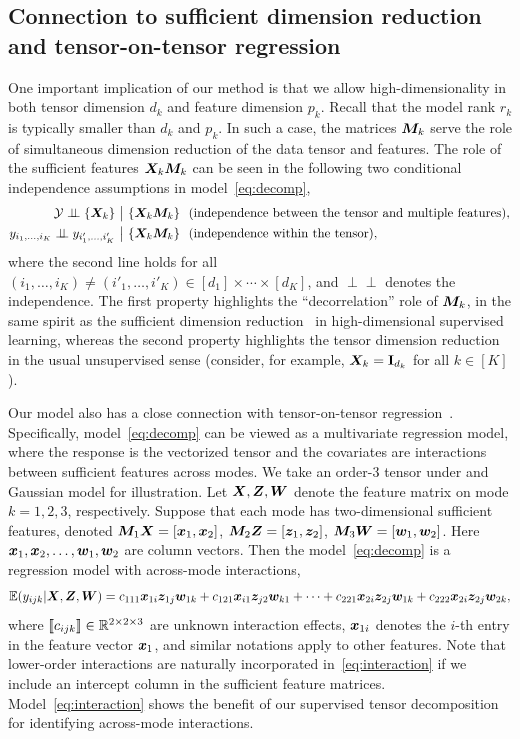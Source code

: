 \documentclass[12pt]{article}
\theoremstyle{definition}
\theoremstyle{definition}
\def\ci{\perp\!\!\!\perp}
\begin{document}
\subsection{Connection to sufficient dimension reduction and tensor-on-tensor regression}\label{sec:connection}
One important implication of our method is that we allow high-dimensionality in both tensor dimension $d_k$ and feature dimension $p_k$. Recall that the model rank $r_k$ is typically smaller than $d_k$ and $p_k$. In such a case, the matrices $\bm M_k$ serve the role of simultaneous dimension reduction of the data tensor and features. The role of the sufficient features $\bm X_k\bm M_k$ can be seen in the following two conditional independence assumptions in model~\eqref{eq:decomp},
\begin{align}
\tY \ci \{\mX_k\}&\ \big|\ \{\mX_k\mM_k\} \ \ \text{(independence between the tensor and multiple features)},\\
y_{i_1,\ldots,i_K} \ci y_{i'_1,\ldots,i'_K} & \ \big|\ \{\mX_k\mM_k\}  \ \ \text{(independence within the tensor)},
\end{align}
where the second line holds for all $(i_1,\ldots,i_K)\neq(i'_1,\ldots,i'_K) \in[d_1]\times\cdots\times[d_K]$, and $\ci$ denotes the independence. The first property highlights the ``decorrelation'' role of $\bm M_k$, in the same spirit as the sufficient dimension reduction~\citep{adragni2009sufficient} in high-dimensional supervised learning, whereas the second property highlights the tensor dimension reduction in the usual unsupervised sense (consider, for example, $\bm X_k=\mathbf{I}_{d_k}$ for all $k\in[K]$).

Our model also has a close connection with tensor-on-tensor regression~\citep{raskutti2019convex, lock2018tensor,han2020optimal}. Specifically, model~\eqref{eq:decomp} can be viewed as a multivariate regression model, where the response is the vectorized tensor and the covariates are interactions between sufficient features across modes. We take an order-3 tensor under and Gaussian model for illustration. Let $\bm X,\bm Z,\bm{W}$ denote the feature matrix on mode $k=1, 2, 3$, respectively. Suppose that each mode has two-dimensional sufficient features, denoted $\bm M_1\bm X=[\bm x_1,\bm x_2]$, $\bm M_2\bm Z=[\bm{z}_1,\bm{z}_2]$, $\bm M_3\bm{W}=[\bm{w}_1,\bm{w}_2]$. Here $\bm x_1,\bm x_2,\ldots,\bm{w}_1, \bm{w}_2$ are column vectors. Then the model~\eqref{eq:decomp} is a regression model with across-mode interactions,
\begin{equation}\label{eq:interaction}
\mathbb{E}(y_{ijk}|\bm X,\bm Z,\bm{W})=c_{111}\bm x_{1i}\bm{z}_{1j}\bm{w}_{1k}+c_{121}\bm x_{i1}\bm{z}_{j2}\bm{w}_{k1}+\cdots+c_{221}\bm x_{2i}\bm{z}_{2j}\bm{w}_{1k}+c_{222}\bm x_{2i}\bm{z}_{2j}\bm{w}_{2k},
\end{equation}
where $\llbracket c_{ijk} \rrbracket \in \mathbb{R}^{2\times 2\times 3}$ are unknown interaction effects, $\bm x_{1i}$ denotes the $i$-th entry in the feature vector $\bm x_1$, and similar notations apply to other features. Note that lower-order interactions are naturally incorporated in~\eqref{eq:interaction} if we include an intercept column in the sufficient feature matrices. Model~\eqref{eq:interaction} shows the benefit of our supervised tensor decomposition for identifying across-mode interactions. 
\end{document}
